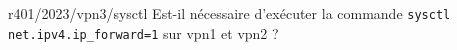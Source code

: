 \begin{question}{r401/2023/vpn3/sysctl}
  Est-il nécessaire d'exécuter la commande \texttt{sysctl
    net.ipv4.ip\_forward=1} sur vpn1 et vpn2 ?
  \begin{reponseshoriz}
  \end{reponseshoriz}
\end{question}
